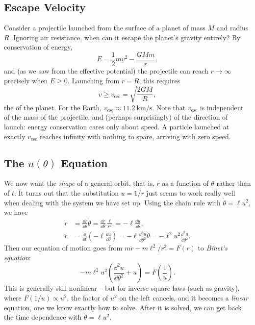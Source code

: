\subsection{Escape Velocity}

Consider a projectile launched from the surface of a planet of mass $M$ and radius $R$. Ignoring air resistance, when can it escape the planet's gravity entirely? By conservation of energy,
$$
E = \frac{1}{2}mv^2 - \frac{GMm}{r},
$$
and (as we saw from the effective potential) the projectile can reach $r \to \infty$ precisely when $E \geq 0$. Launching from $r = R$, this requires
$$
v \geq v_{\text{esc}} = \sqrt{\frac{2GM}{R}},
$$
the  of the planet. For the Earth, $v_{\text{esc}} \approx \SI{11.2}{\kilo\meter\per\second}$. Note that $v_{\text{esc}}$ is independent of the mass of the projectile, and (perhaps surprisingly) of the direction of launch: energy conservation cares only about speed. A particle launched at exactly $v_{\text{esc}}$ reaches infinity with nothing to spare, arriving with zero speed.

\subsection{The $u(\theta)$ Equation}

We now want the \emph{shape} of a general orbit, that is, $r$ as a function of $\theta$ rather than of $t$. It turns out that the substitution $u = 1/r$ just seems to work really well when dealing with the system we have set up. Using the chain rule with $\dot\theta = \ell u^2$, we have
\begin{align*}
	\dot{r} &= \frac{\dd r}{\dd \theta} \dot{\theta} = \frac{\dd r}{\dd\theta} \frac{\ell}{r^2} = -\ell \frac{\dd u}{\dd \theta}, \\
	\ddot{r} &= \frac{\dd}{\dd t}\left(- \ell \frac{\dd u}{\dd\theta}\right) = -\ell \frac{\dd^2 u}{\dd\theta^2}\dot{\theta} = -\ell^2 u^2 \frac{\dd^2 u}{\dd \theta^2}.
\end{align*}
Then our equation of motion goes from $m \ddot{r} - m\ell^2/r^3 = F(r)$ to \emph{Binet's equation}:
$$
-m\ell^2 u^2 \left(\frac{\dd^2 u }{\dd \theta^2} + u\right) = F\left(\frac{1}{u}\right).
$$
This is generally still nonlinear -- but for inverse square laws (such as gravity), where $F(1/u) \propto u^2$, the factor of $u^2$ on the left cancels, and it becomes a \emph{linear} equation, one we know exactly how to solve. After it is solved, we can get back the time dependence with $\dot{\theta} = \ell u^2$.

